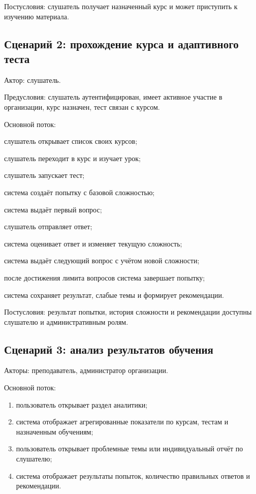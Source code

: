 Постусловия: слушатель получает назначенный курс и может приступить к изучению материала.

\subsection{Сценарий 2: прохождение курса и адаптивного теста}

Актор: слушатель.

Предусловия: слушатель аутентифицирован, имеет активное участие в организации, курс назначен, тест связан с курсом.

Основной поток:
\begin{parenlist}
  \item слушатель открывает список своих курсов;
  \item слушатель переходит в курс и изучает урок;
  \item слушатель запускает тест;
  \item система создаёт попытку с базовой сложностью;
  \item система выдаёт первый вопрос;
  \item слушатель отправляет ответ;
  \item система оценивает ответ и изменяет текущую сложность;
  \item система выдаёт следующий вопрос с учётом новой сложности;
  \item после достижения лимита вопросов система завершает попытку;
  \item система сохраняет результат, слабые темы и формирует рекомендации.
\end{parenlist}

Постусловия: результат попытки, история сложности и рекомендации доступны слушателю и административным ролям.

\subsection{Сценарий 3: анализ результатов обучения}

Акторы: преподаватель, администратор организации.

Основной поток:
\begin{enumerate}
  \item пользователь открывает раздел аналитики;
  \item система отображает агрегированные показатели по курсам, тестам и назначенным обучениям;
  \item пользователь открывает проблемные темы или индивидуальный отчёт по слушателю;
  \item система отображает результаты попыток, количество правильных ответов и рекомендации.
\end{enumerate}

